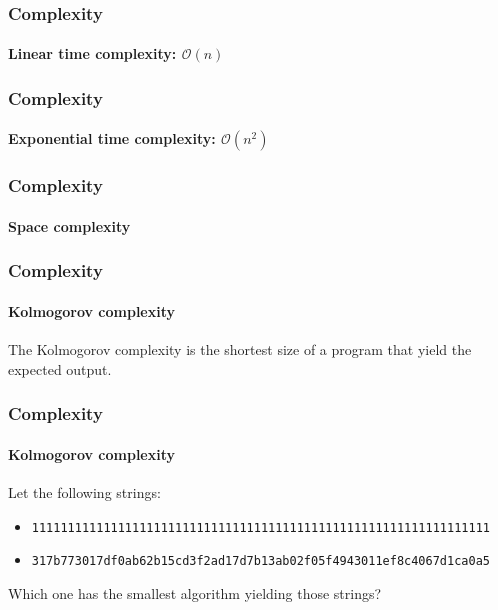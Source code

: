 \begin{frame}
    \frametitle{Complexity}
    \framesubtitle{Linear time complexity: $\mathcal{O}(n)$}
    
\end{frame}

\begin{frame}
    \frametitle{Complexity}
    \framesubtitle{Exponential time complexity: $\mathcal{O}(n^2)$}
    
\end{frame}

\begin{frame}
    \frametitle{Complexity}
    \framesubtitle{Space complexity}
    
\end{frame}

\begin{frame}
    \frametitle{Complexity}
    \framesubtitle{Kolmogorov complexity}

    The Kolmogorov complexity is the shortest size of a program that yield the
    expected output.
\end{frame}

\begin{frame}
    \frametitle{Complexity}
    \framesubtitle{Kolmogorov complexity}

    Let the following strings:

    \pause

    \begin{scriptsize}
        \begin{itemize}[<+->]
            \item \texttt{1111111111111111111111111111111111111111111111111111111111111111}
            \item \texttt{317b773017df0ab62b15cd3f2ad17d7b13ab02f05f4943011ef8c4067d1ca0a5}
        \end{itemize}
    \end{scriptsize}

    \pause[\thebeamerpauses]

    \vfill

    Which one has the smallest algorithm yielding those strings?
\end{frame}

